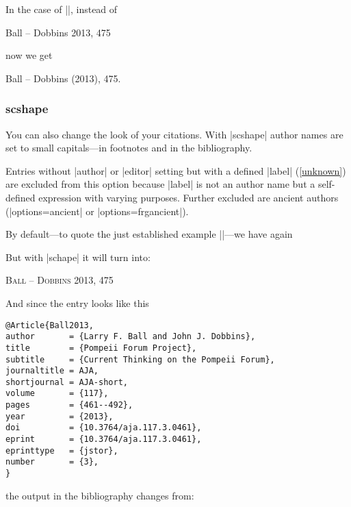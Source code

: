 \documentclass[a4paper,
10pt,
greek,
french,
spanish,
italian,
ngerman,
english
]{ltxdoc}
\begin{document}
In the case of |\cite[475]{Ball2013}|, instead of
\begin{bsp} 
Ball – Dobbins 2013, 475 
\end{bsp}

now we get

\begin{bsp}
Ball – Dobbins {\color{red}(}2013{\color{red})}, 475.
\end{bsp}


\subsubsection{scshape}\label{scshape}
You can also change the look of your citations. 
With |scshape| author names are set to small capitals---in footnotes and in the bibliography.

Entries without |author| or |editor| setting but with a defined
 |label| (\cref{unknown}) are excluded from this option
because |label| is not an author name but a self-defined expression with varying purposes.
Further excluded are ancient authors (|options={ancient}| or |options={frgancient}|).

By default---to quote the just established example |\cite[475]{Ball2013}|---we have again

\begin{bsp} \cite[475]{Ball2013} \end{bsp}

But with |schape| it will turn into:

\begin{bsp}
{\scshape {\color{red}Ball – Dobbins}} 2013, 475
\end{bsp}

And since the entry looks like this

\begin{lstlisting}[style=bibentry,label=Ball2013,caption={{@}Article\{Ball2013,…\} }]
@Article{Ball2013,
author       = {Larry F. Ball and John J. Dobbins},
title        = {Pompeii Forum Project},
subtitle     = {Current Thinking on the Pompeii Forum},
journaltitle = AJA,
shortjournal = AJA-short,
volume       = {117},
pages        = {461--492},
year         = {2013},
doi          = {10.3764/aja.117.3.0461},
eprint       = {10.3764/aja.117.3.0461},
eprinttype   = {jstor},
number       = {3},
}
\end{lstlisting}


the output in the bibliography changes from:

\end{document}
